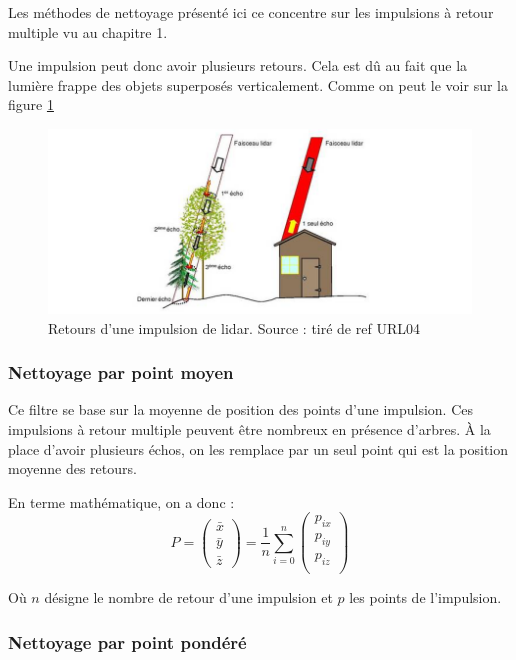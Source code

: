 Les méthodes de nettoyage présenté ici ce concentre sur les impulsions à retour
multiple vu au chapitre 1.

Une impulsion peut donc avoir plusieurs retours. Cela est dû au fait que la
lumière frappe des objets superposés verticalement. Comme on peut le voir sur 
la figure \ref{fig:lidar_echo}

\begin{figure}[htbp!]
    \centering
	\includegraphics[width=0.8\linewidth]{figures/lidar_echo.png}
	\caption{Retours d'une impulsion de lidar. Source : tiré de ref URL04}
	\label{fig:lidar_echo}
\end{figure}



\subsubsection{Nettoyage par point moyen}

Ce filtre se base sur la moyenne de position des points d'une impulsion.
Ces impulsions à retour multiple peuvent être nombreux en présence d'arbres.
À la place d'avoir plusieurs échos, on les remplace par un seul point qui est la
position moyenne des retours.

En terme mathématique, on a donc : 
$$
P = 
\begin{pmatrix}
    \bar{x} \\
    \bar{y} \\
    \bar{z}
\end{pmatrix}
=
\frac{1}{n}
\sum_{i=0}^{n}
\begin{pmatrix}
   p_{ix} \\
   p_{iy} \\
   p_{iz} \\
\end{pmatrix}
$$

Où $n$ désigne le nombre de retour d'une impulsion et $p$ les points de l'impulsion.



\subsubsection{Nettoyage par point pondéré}

